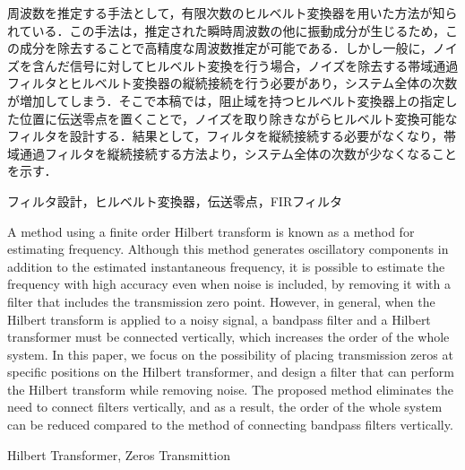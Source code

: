 \documentclass[technicalreport]{ieicej}
\begin{document}
\begin{jabstract}
周波数を推定する手法として，有限次数のヒルベルト変換器を用いた方法が知られている．この手法は，推定された瞬時周波数の他に振動成分が生じるため，この成分を除去することで高精度な周波数推定が可能である．しかし一般に，ノイズを含んだ信号に対してヒルベルト変換を行う場合，ノイズを除去する帯域通過フィルタとヒルベルト変換器の縦続接続を行う必要があり，システム全体の次数が増加してしまう．そこで本稿では，阻止域を持つヒルベルト変換器上の指定した位置に伝送零点を置くことで，ノイズを取り除きながらヒルベルト変換可能なフィルタを設計する．結果として，フィルタを縦続接続する必要がなくなり，帯域通過フィルタを縦続接続する方法より，システム全体の次数が少なくなることを示す．
\end{jabstract}
\begin{jkeyword}
フィルタ設計，ヒルベルト変換器，伝送零点，FIRフィルタ
\end{jkeyword}
\begin{eabstract}
A method using a finite order Hilbert transform is known as a method for estimating frequency. Although this method generates oscillatory components in addition to the estimated instantaneous frequency, it is possible to estimate the frequency with high accuracy even when noise is included, by removing it with a filter that includes the transmission zero point. However, in general, when the Hilbert transform is applied to a noisy signal, a bandpass filter and a Hilbert transformer must be connected vertically, which increases the order of the whole system. In this paper, we focus on the possibility of placing transmission zeros at specific positions on the Hilbert transformer, and design a filter that can perform the Hilbert transform while removing noise. The proposed method eliminates the need to connect filters vertically, and as a result, the order of the whole system can be reduced compared to the method of connecting bandpass filters vertically.

\end{eabstract}
\begin{ekeyword}
Hilbert Transformer,  Zeros Transmittion
\end{ekeyword}
\maketitle
\end{document}
